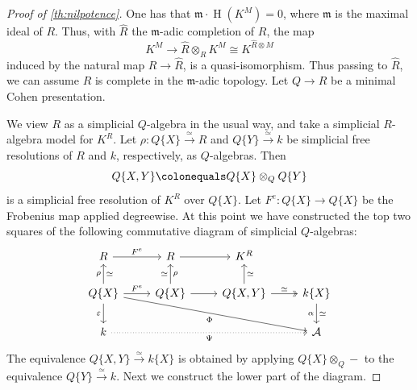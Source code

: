 \documentclass{amsart}
\newcommand{\xra}{\xrightarrow}
\newcommand{\fm}{\mathfrak{m}}
\newcommand{\hh}{\operatorname{H}}
\theoremstyle{definition}
\theoremstyle{remark}
\numberwithin{equation}{subsection}
\begin{document}
\begin{proof}[Proof of \cref{th:nilpotence}]
One has that $\fm\cdot \hh(K^M)=0$, where $\fm$ is the maximal ideal of $R$. Thus, with $\widehat{R}$ the $\fm$-adic completion of $R$, the map 
\[
K^M \longrightarrow \widehat{R}\otimes_R K^M \cong K^{\widehat R\otimes M}
\]
induced by the natural map $R\to \widehat{R}$, is a quasi-isomorphism. Thus passing to $\widehat R$, we can assume $R$ is complete in the $\fm$-adic topology. Let $Q\to R$ be a minimal Cohen presentation. 

We view $R$ as a simplicial $Q$-algebra in the usual way, and take a simplicial $R$-algebra model for $K^R$. Let $\rho\colon Q\{X\}\xra{\simeq}R$ and $Q\{Y\}\xra{\simeq}k$ be simplicial free resolutions of $R$ and $k$, respectively, as $Q$-algebras. Then 
\[
Q\{X,Y\}\colonequals Q\{X\}\otimes_QQ\{Y\}
\]
is a simplicial free resolution of $K^R$ over $Q\{X\}$. Let $F^e\colon Q\{X\}\to Q\{X\}$ be the Frobenius map applied degreewise. At this point we have constructed the top two squares of the following commutative diagram of simplicial $Q$-algebras:
\[
\begin{tikzcd}
R\ar[r,"F ^e"] & R \ar[r] & K^R \\
Q\{X\}\ar[u,"\simeq" swap, "\rho"] \ar[r,"F ^e"] \ar[drrr, "\Phi" swap] \ar[d,"\varepsilon" swap] 
 & Q\{X\} \ar[u,"\simeq", "\rho" swap] \ar[r] 
 & Q\{X,Y\} \ar[u,"\simeq" swap] \ar[r,twoheadrightarrow,"\simeq"] 
 & k\{X\} \ar[d, "\simeq", "\alpha" swap] \\
k \ar[rrr,dotted, "\Psi" swap]& & & \mathcal{A}
\end{tikzcd}
\]
The equivalence $Q\{X,Y\}\xra{\simeq} k\{X\}$ is obtained by applying $Q\{X\}\otimes_Q-$ to the equivalence $Q\{Y\}\xra{\simeq} k$. Next we construct the lower part of the diagram.


\end{proof}
\end{document}
